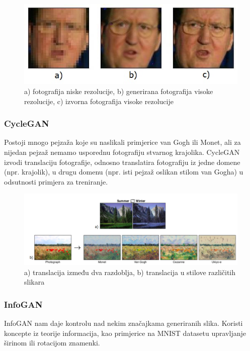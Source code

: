 \documentclass[times, utf8, diplomski]{fer}
\begin{document}
\begin{figure}[h]
\centering
\includegraphics[scale=0.8]{SRGAN.jpg}
\caption{a) fotografija niske rezolucije, b) generirana fotografija visoke rezolucije, c) izvorna fotografija visoke rezolucije \cite{slika1}}
\end{figure}

\subsubsection{CycleGAN}
Postoji mnogo pejzaža koje su naslikali primjerice van Gogh ili Monet, ali za nijedan pejzaž nemamo usporednu fotografiju stvarnog krajolika. CycleGAN izvodi translaciju fotografije, odnosno translatira fotografiju iz jedne domene (npr. krajolik), u drugu domenu (npr. isti pejzaž oslikan stilom van Gogha) u odsutnosti primjera za treniranje. \cite{Tipovi}

\begin{figure}[h]
\centering
\includegraphics[scale=0.5]{CycleGAN.png}
\caption{a) translacija između dva razdoblja, b) translacija u stilove različitih slikara \cite{Tipovi}}
\end{figure}

\subsubsection{InfoGAN}
InfoGAN nam daje kontrolu nad nekim značajkama generiranih slika. Koristi koncepte iz teorije informacija, kao primjerice na MNIST datasetu upravljanje širinom ili rotacijom znamenki. \cite{Tipovi}
\end{document}
